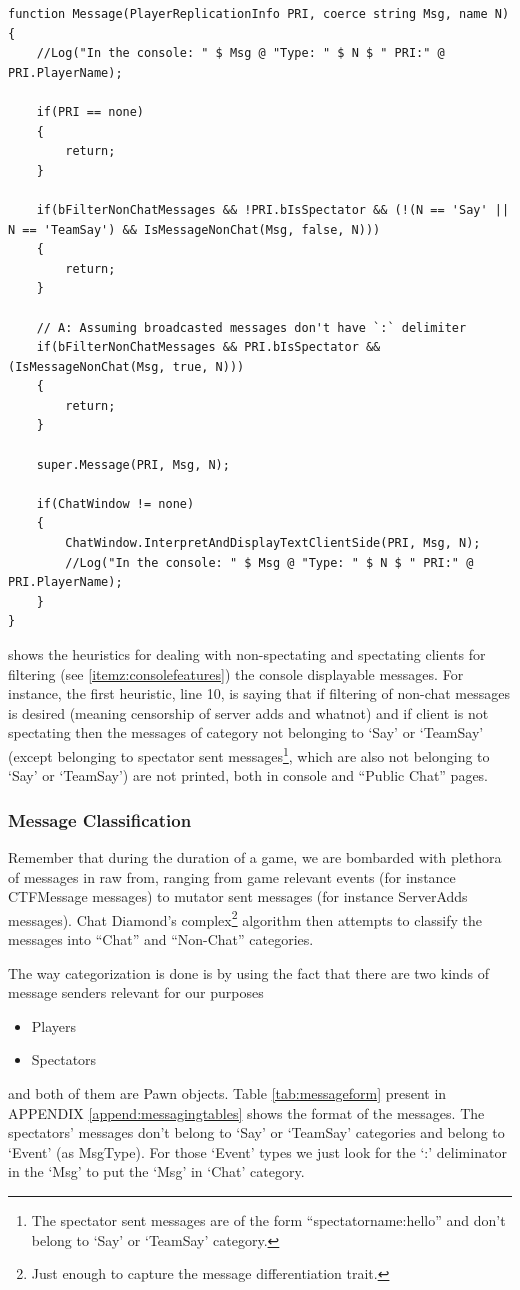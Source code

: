 \documentclass{article}
\theoremstyle{definition}
\newcommand{\ClassColor}[1]{{\color{myinfrared} #1}}
\begin{document}
\begin{lstlisting}[frame=single]
function Message(PlayerReplicationInfo PRI, coerce string Msg, name N)
{
 	//Log("In the console: " $ Msg @ "Type: " $ N $ " PRI:" @ PRI.PlayerName);

 	if(PRI == none)
 	{
 	 	return;
 	}

 	if(bFilterNonChatMessages && !PRI.bIsSpectator && (!(N == 'Say' || N == 'TeamSay') && IsMessageNonChat(Msg, false, N)))
 	{
 		return;
 	}

 	// A: Assuming broadcasted messages don't have `:` delimiter
 	if(bFilterNonChatMessages && PRI.bIsSpectator && (IsMessageNonChat(Msg, true, N)))
 	{
 		return;
 	}

 	super.Message(PRI, Msg, N);

 	if(ChatWindow != none)
 	{
 		ChatWindow.InterpretAndDisplayTextClientSide(PRI, Msg, N);
 		//Log("In the console: " $ Msg @ "Type: " $ N $ " PRI:" @ PRI.PlayerName);
 	}
}  
\end{lstlisting}
shows the heuristics for dealing with non-spectating and spectating clients for filtering (see \ref{itemz:consolefeatures}) the console displayable messages.  For instance, the first heuristic, line 10, is saying that if filtering of non-chat messages is desired (meaning censorship of server adds and whatnot) and if client is not spectating then the messages of category not belonging to `Say' or `TeamSay' (except belonging to spectator sent messages\footnote{The spectator sent messages are of the form ``spectatorname:hello'' and don't belong to `Say' or `TeamSay' category.}, which are also not belonging to `Say' or `TeamSay')  are not printed, both in console and ``Public Chat'' pages.

\subsubsection{Message Classification}    
Remember that during the duration of a game, we are bombarded with plethora of messages in raw from, ranging from game relevant events (for instance \ClassColor{CTFMessage} messages) to mutator sent messages (for instance ServerAdds messages).  Chat Diamond's complex\footnote{Just enough to capture the message differentiation trait.} algorithm then attempts to classify the messages into ``Chat'' and ``Non-Chat'' categories.

The way categorization is done is by using the fact that there are two kinds of message senders relevant for our purposes
\begin{itemize}
\item Players
\item Spectators
\end{itemize}
and both of them are \ClassColor{Pawn} objects. Table \ref{tab:messageform} present in APPENDIX \ref{append:messagingtables} shows the format of the messages.  The spectators' messages don't belong to `Say' or `TeamSay' categories and belong to `Event' (as MsgType).  For those `Event' types we just look for the `:' deliminator in the `Msg' to put the `Msg' in `Chat' category.
\end{document}
